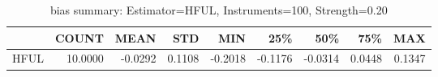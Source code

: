 \begin{table}[ht]
\centering
\caption{bias summary: Estimator=HFUL, Instruments=100, Strength=0.20}
\begin{tabular}{lrrrrrrrr}
\toprule
 & COUNT & MEAN & STD & MIN & 25\% & 50\% & 75\% & MAX \\
\midrule
HFUL & 10.0000 & -0.0292 & 0.1108 & -0.2018 & -0.1176 & -0.0314 & 0.0448 & 0.1347 \\
\bottomrule
\end{tabular}
\end{table}
